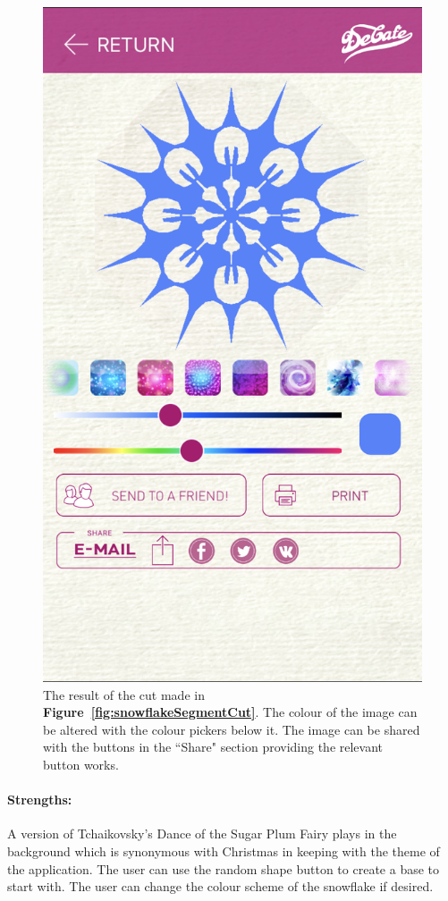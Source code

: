 \documentclass[11pt]{article}
\begin{document}
\begin{figure}[!ht]
\begin{minipage}{0.45\textwidth}
                            \includegraphics[width=0.7\linewidth]{Images/snowflakeResult}
                            \caption{The result of the cut made in \textbf{Figure~\ref{fig:snowflakeSegmentCut}}. The colour of the image can be altered with the colour pickers below it. The image can be shared with the buttons in the ``Share" section providing the relevant button works.}
                            \label{fig:snowflakeResult}
                        \end{minipage}
                    \end{figure}
                    
                    
                    
                \paragraph{Strengths:}
                A version of Tchaikovsky's Dance of the Sugar Plum Fairy plays in the background which is synonymous with Christmas in keeping with the theme of the application. 
                The user can use the random shape button to create a base to start with. The user can change the colour scheme of the snowflake if desired.
                
\end{document}
